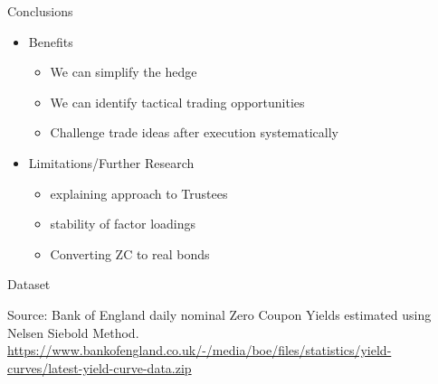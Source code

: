 \documentclass[ignorenonframetext,]{beamer}
\providecommand{\tightlist}{%
  \setlength{\itemsep}{0pt}\setlength{\parskip}{0pt}}
\begin{document}
\begin{frame}{Conclusions}
\protect\hypertarget{conclusions}{}

\begin{itemize}
\tightlist
\item
  Benefits

  \begin{itemize}
  \tightlist
  \item
    We can simplify the hedge
  \item
    We can identify tactical trading opportunities
  \item
    Challenge trade ideas after execution systematically
  \end{itemize}
\item
  Limitations/Further Research

  \begin{itemize}
  \tightlist
  \item
    explaining approach to Trustees
  \item
    stability of factor loadings
  \item
    Converting ZC to real bonds
  \end{itemize}
\end{itemize}

\end{frame}

\begin{frame}{Dataset}
\protect\hypertarget{dataset}{}

Source: Bank of England daily nominal Zero Coupon Yields estimated using
Nelsen Siebold Method.
\url{https://www.bankofengland.co.uk/-/media/boe/files/statistics/yield-curves/latest-yield-curve-data.zip}

\end{frame}
\end{document}
